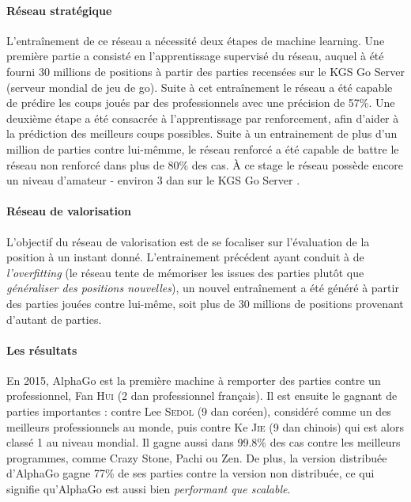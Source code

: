 \paragraph{Réseau stratégique} L'entraînement de ce réseau a nécessité deux étapes de machine learning. Une première partie a 
consisté en l'apprentissage supervisé du réseau, auquel à été fourni 30 millions de positions à partir des parties recensées sur 
le KGS Go Server (serveur mondial de jeu de go). Suite à cet entraînement le réseau a été capable de prédire les coups joués par 
des professionnels avec une précision de 57\%. Une deuxième étape a été consacrée à l'apprentissage par renforcement, afin d'aider
à la prédiction des meilleurs coups possibles. Suite à un entrainement de plus d'un million de parties contre lui-mêmme, le réseau
renforcé a été capable de battre le réseau non renforcé dans plus de 80\% des cas. À ce stage le réseau possède encore un niveau
d'amateur - environ 3 dan sur le KGS Go Server \cite{AlphaGo1}.

\paragraph{Réseau de valorisation} L'objectif du réseau de valorisation est de se focaliser sur l'évaluation de la position à un
instant donné. L'entrainement précédent ayant conduit à de \emph{l'overfitting} (le réseau tente de mémoriser les issues des parties
plutôt que \emph{généraliser des positions nouvelles}), un nouvel entraînement a été généré à partir des parties jouées contre
lui-même, soit plus de 30 millions de positions provenant d'autant de parties.

\paragraph{Les résultats} En 2015, AlphaGo est la première machine à remporter des parties contre un professionnel, Fan H\textsc{ui} (2 dan professionnel
français). Il est ensuite le gagnant de parties importantes : contre Lee S\textsc{edol} (9 dan coréen), considéré comme un des meilleurs professionnels
au monde, puis contre Ke J\textsc{ie} (9 dan chinois) qui est alors classé 1 au niveau mondial. Il gagne aussi dans 99.8\% des cas contre
les meilleurs programmes, comme Crazy Stone, Pachi ou Zen. De plus, la version distribuée d'AlphaGo gagne 77\% de ses parties
contre la version non distribuée, ce qui signifie qu'AlphaGo est aussi bien \emph{performant que scalable}.


